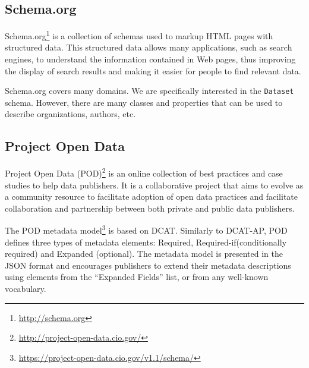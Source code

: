 \documentclass[runningheads,a4paper]{../../Tools/LaTEX/llncs}
\begin{document}
\subsection{Schema.org}
Schema.org\footnote{\url{http://schema.org}} is a collection of schemas used to markup HTML pages with structured data. This structured data allows many applications, such as search engines, to understand the information contained in Web pages, thus improving the display of search results and making it easier for people to find relevant data.

Schema.org covers many domains. We are specifically interested in the \texttt{Dataset} schema. However, there are many classes and properties that can be used to describe organizations, authors, etc.

\subsection{Project Open Data}
Project Open Data (POD)\footnote{\url{http://project-open-data.cio.gov/}} is an online collection of best practices and case studies to help data publishers. It is a collaborative project that aims to evolve as a community resource to facilitate adoption of open data practices and facilitate collaboration and partnership between both private and public data publishers.

The POD metadata model\footnote{\url{https://project-open-data.cio.gov/v1.1/schema/}} is based on DCAT. Similarly to DCAT-AP, POD defines three types of metadata elements: Required, Required-if(conditionally required) and Expanded (optional). The metadata model is presented in the JSON format and encourages publishers to extend their metadata descriptions using elements from the ``Expanded Fields'' list, or from any well-known vocabulary.

\end{document}
